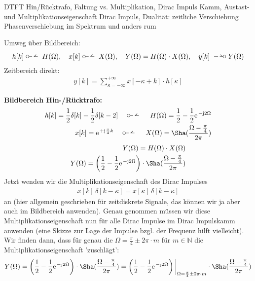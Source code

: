 \begin{Werkzeug}
DTFT Hin/Rücktrafo, Faltung vs. Multiplikation, Dirac Impuls Kamm,
Austast- und Multiplikationseigenschaft Dirac Impuls, Dualität:
zeitliche Verschiebung = Phasenverschiebung im Spektrum und anders rum
\end{Werkzeug}
\begin{Ansatz}
Umweg über Bildbereich:
\begin{align}
h[k]\dtft H(\Omega),\quad x[k]\dtft X(\Omega),\quad
Y(\Omega) = H(\Omega) \cdot X(\Omega),\quad
y[k] \DTFT Y(\Omega)
\end{align}
Zeitbereich direkt:
\begin{align}
y[k] = \sum_{\kappa=-\infty}^{+\infty} x[-\kappa + k] \cdot h[\kappa]
\end{align}
\end{Ansatz}
\begin{ExCalc}
\textbf{Bildbereich Hin-/Rücktrafo:}
\begin{align}
h[k] = \frac{1}{2}\delta[k] - \frac{1}{2}\delta[k-2]\quad\dtft\quad
H(\Omega) = \frac{1}{2} - \frac{1}{2} \e^{-\im 2 \Omega}\\
x[k]=\e^{+\im \frac{\pi}{4} k} \quad\dtft\quad
X(\Omega) = \Sha(\frac{\Omega-\frac{\pi}{4}}{2\pi})
\end{align}
%
\begin{align}
Y(\Omega) = H(\Omega) \cdot X(\Omega)\\
Y(\Omega) = \left(\frac{1}{2} - \frac{1}{2} \e^{-\im 2 \Omega}\right)
\cdot
\Sha(\frac{\Omega-\frac{\pi}{4}}{2\pi})
\end{align}
%
Jetzt wenden wir die Multiplikationseigenschaft des Dirac Impulses
\begin{align}
x[k] \, \delta[k-\kappa] = x[\kappa] \, \delta[k-\kappa]
\end{align}
an (hier allgemein geschrieben für zeitdiskrete Signale, das können wir ja aber auch im
Bildbereich anwenden).
%
Genau genommen müssen wir diese Multiplikationseigenschaft nun für alle Dirac Impulse
im Dirac Impulskamm anwenden (eine Skizze zur Lage der Impulse bzgl. der Frequenz
hilft vielleicht).
%
Wir finden dann, dass für genau die $\Omega=\frac{\pi}{4}\pm 2\pi \cdot m$ für $m\in\mathbb{N}$
die Multiplikationseigenschaft 'zuschlägt':
\begin{align}
Y(\Omega) = \left(\frac{1}{2} - \frac{1}{2} \e^{-\im 2 \Omega}\right)
\cdot
\Sha(\frac{\Omega-\frac{\pi}{4}}{2\pi})
=
\left(\frac{1}{2} - \frac{1}{2} \e^{-\im 2 \Omega}\right)\bigg|_{\Omega=\frac{\pi}{4}\pm 2\pi \cdot m}
\cdot
\Sha(\frac{\Omega-\frac{\pi}{4}}{2\pi})

\end{align}
\end{ExCalc}
